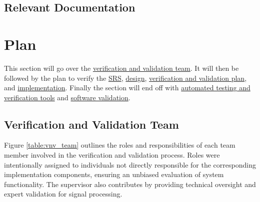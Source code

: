 \documentclass[12pt, titlepage]{article}
\begin{document}
\subsection{Relevant Documentation}



\section{Plan}

This section will go over the \hyperref[sec:vnv_team]{verification and
validation team}. It will then be followed by the plan to verify the
\hyperref[sec:srs_verification]{SRS},
\hyperref[sec:design_verification]{design}, 
\hyperref[sec:vnv_plan_verification]{verification and validation plan}, and
\hyperref[sec:implementation_verification]{implementation}. Finally the section
will end off with 
\hyperref[sec:testing_tools]{automated testing and verification tools} and
\hyperref[sec:software_validation]{software validation}.

\subsection{Verification and Validation Team}\label{sec:vnv_team}

Figure \ref{table:vnv_team} outlines the roles and responsibilities of each
team member involved in the verification and validation process. Roles were
intentionally assigned to individuals not directly responsible for the
corresponding implementation components, ensuring an unbiased evaluation of 
system functionality. The supervisor also contributes by providing technical
oversight and expert validation for signal processing.
\end{document}
